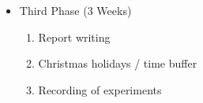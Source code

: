 \documentclass[a4paper, twocolumn]{article}
\begin{document}
\begin{itemize}
    \item[] Third Phase (3 Weeks)
    \begin{enumerate}
        \setcounter{enumi}{\value{remember}}
        \item Report writing
        \item Christmas holidays / time buffer
        \item Recording of experiments
    \end{enumerate}
\end{itemize}	




\end{document}
